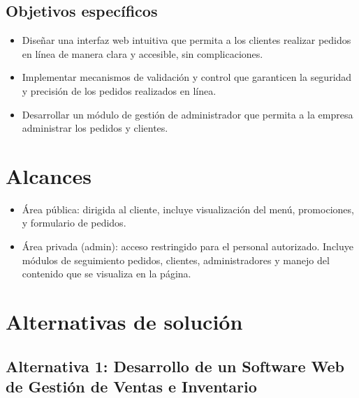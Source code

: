 \documentclass{article}
\begin{document}
\begin{doublespace}
    \subsection{Objetivos específicos}
    \begin{itemize}
        \item Diseñar una interfaz web intuitiva que permita a los clientes realizar pedidos en línea de manera clara y accesible, sin complicaciones.
        \item Implementar mecanismos de validación y control que garanticen la seguridad y precisión de los pedidos realizados en línea.
        \item Desarrollar un módulo de gestión de administrador que permita a la empresa administrar los pedidos y clientes.
    \end{itemize}
    \newpage
    \vspace*{0.5cm}
    \section{Alcances}
    \begin{itemize}
        \item Área pública: dirigida al cliente, incluye visualización del menú, promociones, y formulario de pedidos.
        \item Área privada (admin): acceso restringido para el personal autorizado. Incluye módulos de seguimiento pedidos, clientes, administradores y manejo del contenido que se visualiza en la página.
    \end{itemize}

    \section{Alternativas de solución}
    \subsection{Alternativa 1: Desarrollo de un Software Web de Gestión de Ventas e Inventario}


\end{doublespace}
\end{document}
